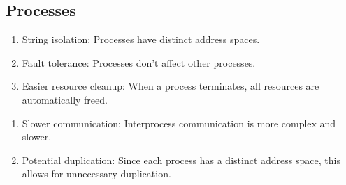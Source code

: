 \documentclass{report}
\begin{document}
\subsection*{Processes}
\begin{tcbraster}[raster columns=2, raster equal height, raster force size=false]
  \begin{tcolorbox}[colback=green!5!white,colframe=black!75!green,title=Advantages]
    \begin{enumerate}[label=\textit{(\roman*)}]
    \item String isolation: Processes have distinct address spaces.
    \item Fault tolerance: Processes don't affect other processes.
    \item Easier resource cleanup: When a process terminates, all resources are automatically freed.
    \end{enumerate}
  \end{tcolorbox}
  \begin{tcolorbox}[colback=red!5!white,colframe=black!40!red,title=Disadvantages]
    \begin{enumerate}[label=\textit{(\roman*)}]
    \item Slower communication: Interprocess communication is more complex and slower.
    \item Potential duplication: Since each process has a distinct address space, this allows for
      unnecessary duplication.
    \end{enumerate}
  \end{tcolorbox}
\end{tcbraster}
\end{document}
